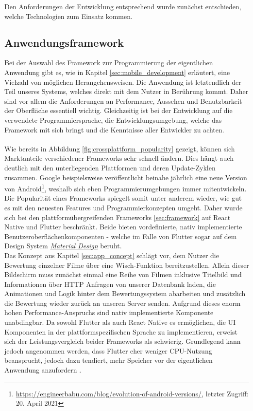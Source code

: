 Den Anforderungen der Entwicklung entsprechend wurde zunächst entschieden, welche Technologien zum Einsatz kommen. 

\subsection{Anwendungsframework}
Bei der Auswahl des Framework zur Programmierung der eigentlichen Anwendung gibt es, wie in Kapitel \ref{sec:mobile_development} erläutert, eine Vielzahl von möglichen Herangehensweisen.
Die Anwendung ist letztendlich der Teil unseres Systems, welches direkt mit dem Nutzer in Berührung kommt.
Daher sind vor allem die Anforderungen an Performance, Aussehen und Benutzbarkeit der Oberfläche essentiell wichtig.
Gleichzeitig ist bei der Entwicklung auf die verwendete Programmiersprache, die Entwicklungsumgebung, welche das Framework mit sich bringt und die Kenntnisse aller Entwickler zu achten.\\
\\
Wie bereits in Abbildung \ref{fig:crossplattform_popularity} gezeigt, können sich Marktanteile verschiedener Frameworks sehr schnell ändern. 
Dies hängt auch deutlich mit den unterliegenden Plattformen und deren Update-Zyklen zusammen.
Google beispielsweise veröffentlicht beinahe jährlich eine neue Version von Android\footnote{\url{https://engineerbabu.com/blog/evolution-of-android-versions/}, letzter Zugriff: 20. April 2021}, weshalb sich eben Programmierumgebungen immer mitentwickeln.
Die Popularität eines Frameworks spiegelt somit unter anderem wieder, wie gut es mit den neuesten Features und Programmierkonzepten umgeht. 
Daher wurde sich bei den plattformübergreifenden Frameworks \ref{sec:framework} auf React Native und Flutter beschränkt. 
Beide bieten vordefinierte, nativ implementierte Benutzeroberflächenkomponenten - welche im Falle von Flutter sogar auf dem Design System \href{https://material.io/}{\textit{Material Design}} beruht.\\
Das Konzept aus Kapitel \ref{sec:app_concept} schlägt vor, dem Nutzer die Bewertung einzelner Filme über eine Wisch-Funktion bereitzustellen.
Allein dieser Bildschirm muss zunächst einmal eine Reihe von Filmen inklusive Titelbild und Informationen über HTTP Anfragen von unserer Datenbank laden, die Animationen und Logik hinter dem Bewertungssystem abarbeiten und zusätzlich die Bewertung wieder zurück an unseren Server senden.
Aufgrund dieses enorm hohen Performance-Anspruchs sind nativ implementierte Komponente unabdingbar.
Da sowohl Flutter als auch React Native es ermöglichen, die UI Komponenten in der plattformspezifischen Sprache zu implementieren, erweist sich der Leistungsvergleich beider Frameworks als schwierig.
Grundlegend kann jedoch angenommen werden, dass Flutter eher weniger CPU-Nutzung beansprucht, jedoch dazu tendiert, mehr Speicher vor der eigentlichen Anwendung anzufordern \cite{bjorn-hansen2020}.


